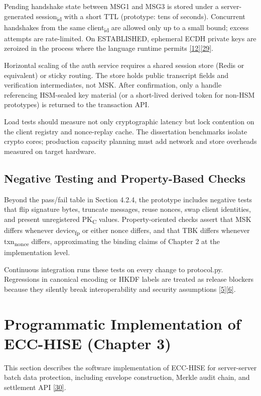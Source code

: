 \indent Pending handshake state between MSG1 and MSG3 is stored under a server-generated session\textsubscript{id} with a short TTL (prototype: tens of seconds). Concurrent handshakes from the same client\textsubscript{id} are allowed only up to a small bound; excess attempts are rate-limited. On ESTABLISHED, ephemeral ECDH private keys are zeroized in the process where the language runtime permits \hyperref[ref:12]{[12]}\hyperref[ref:29]{[29]}.

\indent Horizontal scaling of the auth service requires a shared session store (Redis or equivalent) or sticky routing. The store holds public transcript fields and verification intermediates, not MSK. After confirmation, only a handle referencing HSM-sealed key material (or a short-lived derived token for non-HSM prototypes) is returned to the transaction API.

\indent Load tests should measure not only cryptographic latency but lock contention on the client registry and nonce-replay cache. The dissertation benchmarks isolate crypto cores; production capacity planning must add network and store overheads measured on target hardware.

\subsection{Negative Testing and Property-Based Checks}

\indent Beyond the pass/fail table in Section 4.2.4, the prototype includes negative tests that flip signature bytes, truncate messages, reuse nonces, swap client identities, and present unregistered PK\textsubscript{C} values. Property-oriented checks assert that MSK differs whenever device\textsubscript{fp} or either nonce differs, and that TBK differs whenever txn\textsubscript{nonce} differs, approximating the binding claims of Chapter 2 at the implementation level.

\indent Continuous integration runs these tests on every change to protocol.py. Regressions in canonical encoding or HKDF labels are treated as release blockers because they silently break interoperability and security assumptions \hyperref[ref:5]{[5]}\hyperref[ref:6]{[6]}.

\section{Programmatic Implementation of ECC-HISE (Chapter 3)}

\indent This section describes the software implementation of ECC-HISE for server-server batch data protection, including envelope construction, Merkle audit chain, and settlement API \hyperref[ref:30]{[30]}.

